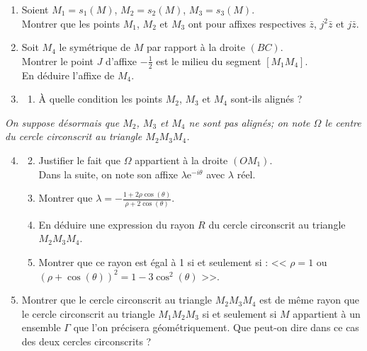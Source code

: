 \documentclass[landscape,twocolumn,leqno,a4paper,10pt]{report} %
\newcommand\n{\noindent}
\newcommand{\e}{\mathrm{e}}
\begin{document}
\begin{enumerate}
	\item Soient $M_{1}=s_{1}(M)$, $M_{2}=s_{2}(M)$, $M_{3}=s_{3}(M)$.\\
	Montrer que les points $M_{1}$, $M_{2}$ et $M_{3}$ ont pour affixes respectives $\bar{z}$, $j^{2} \bar{z}$ et $j \bar{z}$.
	\item Soit $M_{4}$ le symétrique de $M$ par rapport à la droite $(B C)$.\\
	Montrer le point $J$ d'affixe $-\frac{1}{2}$ est le milieu du segment $\left[M_{1} M_{4}\right]$.\\
	En déduire l'affixe de $M_{4}$.
	\item \begin{enumerate}
		\item À quelle condition les points $M_{2}$, $M_{3}$ et $M_{4}$ sont-ils alignés ?
	\end{enumerate}
\end{enumerate}

\n \textit{On suppose désormais que $M_{2}$, $M_{3}$ et $M_{4}$ ne sont pas alignés; on note $\Omega$ le centre du cercle circonscrit au triangle $M_{2} M_{3} M_{4}$.}
\begin{enumerate}\setcounter{enumi}{3}
	\item[]	\begin{enumerate}\setcounter{enumii}{1}
		\item Justifier le fait que $\Omega$ appartient à la droite $\left(O M_{1}\right)$.\\
		Dans la suite, on note son affixe $\lambda \e^{-i \theta}$ avec $\lambda$ réel.
		\item Montrer que $\lambda=-\frac{1+2 \rho \cos (\theta)}{\rho+2 \cos (\theta)}$.
		\item En déduire une expression du rayon $R$ du cercle circonscrit au triangle $M_{2} M_{3} M_{4}$.
		\item Montrer que ce rayon est égal à 1 si et seulement si : << $\rho=1$ ou $(\rho+\cos (\theta))^{2}=1-3 \cos ^{2}(\theta)$ >>.
	\end{enumerate}
	\item Montrer que le cercle circonscrit au triangle $M_{2} M_{3} M_{4}$ est de même rayon que le cercle circonscrit au triangle $M_{1} M_{2} M_{3}$ si et seulement si $M$ appartient à un ensemble $\Gamma$ que l'on précisera géométriquement. Que peut-on dire dans ce cas des deux cercles circonscrits ?
\end{enumerate}
\end{document}
